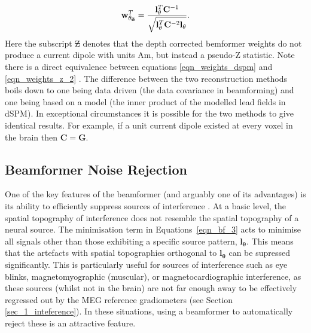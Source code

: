 \begin{equation} \label{eqn_weights_z_2}
\mathbf{w}^T_{\mathbf{\theta}_{\text{\sout{Z}}}} = \frac{\mathbf{l}^T_\mathbf{\theta}\mathbf{C}^{-1}}{\sqrt{\mathbf{l}^T_\mathbf{\theta}\mathbf{C}^{-2}\mathbf{l}_\mathbf{\theta}}}.
\end{equation} Here the subscript \sout{Z} denotes that the depth corrected bemformer weights do not produce a current dipole with units Am, but instead a pseudo-Z statistic. Note there is a direct equivalence between equations \ref{eqn_weights_dspm} and \ref{eqn_weights_z_2} \citep{Mosher2003}. The difference between the two reconstruction methods boils down to one being data driven (the data covariance in beamforming) and one being based on a model (the inner product of the modelled lead fields in dSPM). In exceptional circumstances it is possible for the two methods to give identical results. For example, if a unit current dipole existed at every voxel in the brain then $\mathbf{C} = \mathbf{G} $.  

\subsection{Beamformer Noise Rejection}

One of the key features of the beamformer (and arguably one of its advantages) is its ability to efficiently suppress sources of interference \citep{Sekihara2001,Sekihara2006,Brookes2008}. At a basic level, the spatial topography of interference does not resemble the spatial topography of a neural source.  The minimisation term in Equations \ref{eqn_bf_3} acts to minimise all signals other than those exhibiting a specific source pattern, $\mathbf{l_\theta}$. This means that the artefacts with spatial topographies orthogonal to $\mathbf{l_\theta}$ can be supressed significantly. This is particularly useful for sources of interference such as eye blinks, magnetomyographic (muscular), or magnetocardiographic interference, as these sources (whilst not in the brain) are not far enough away to be effectively regressed out by the MEG reference gradiometers (see Section \ref{sec_1_inteference}). In these situations, using a beamformer to automatically reject these is an attractive feature. 

